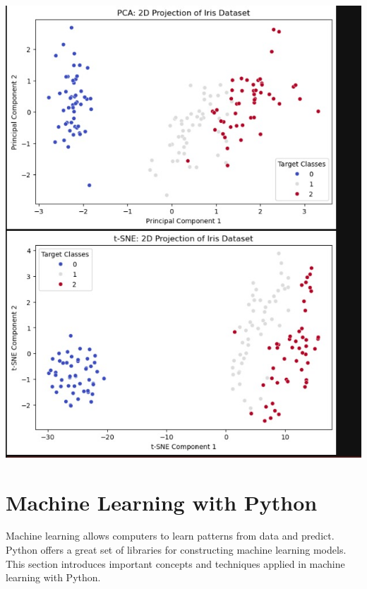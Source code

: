 \documentclass{article}
\begin{document}
\includegraphics[width=14cm,height=12
cm]{Dimensionality Reduction_Output.jpeg}

\newpage
\section{Machine Learning with Python}
Machine learning allows computers to learn patterns from data and predict. Python offers a great set of libraries for constructing machine learning models. This section introduces important concepts and techniques applied in machine learning with Python.
\end{document}
